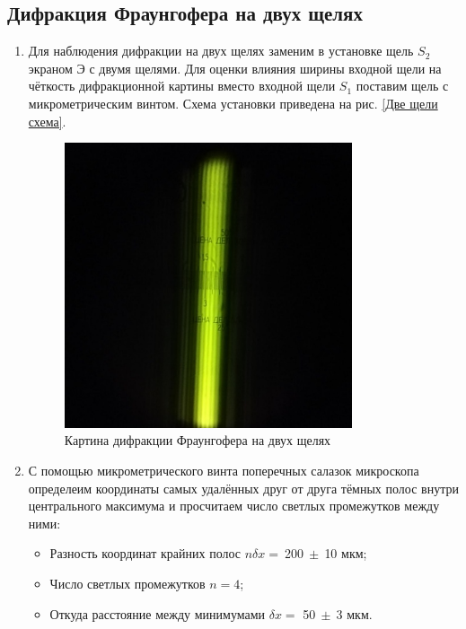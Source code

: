 \documentclass[a4paper, 12pt]{article}
\begin{document}
\newpage
\subsection{Дифракция Фраунгофера на двух щелях}

\begin{enumerate}
	\item Для наблюдения дифракции на двух щелях заменим в установке щель $S_2$ экраном Э с двумя щелями. Для оценки влияния ширины входной щели на чёткость дифракционной картины вместо входной щели $S_1$ поставим щель с микрометрическим винтом. Схема установки приведена на рис. \ref{Две щели схема}.

	\begin{figure}[h!]
		\centering
		\includegraphics[width=0.8\textwidth]{Fraungofer_two_slots.jpg}
		\caption{Картина дифракции Фраунгофера на двух щелях}
	\end{figure}

	\item С помощью микрометрического винта поперечных салазок микроскопа определеим координаты самых удалённых друг от друга тёмных полос внутри центрального максимума и просчитаем число светлых промежутков между ними:

	\begin{itemize}
		\item Разность координат крайних полос $n \delta x =~$200$~\pm~$10 мкм;
		\item Число светлых промежутков $n = 4$;
		\item Откуда расстояние между минимумами $\delta x =$ 50$~\pm~$3 мкм.
	\end{itemize}


\end{enumerate}
\end{document}
